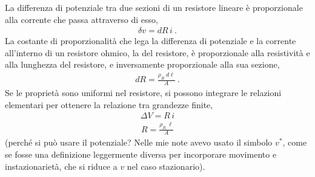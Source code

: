 \documentclass[letterpaper,10pt,english]{jupyterBook}
\begin{document}
\sphinxAtStartPar
{} La differenza di potenziale tra due sezioni di un resistore lineare è proporzionale alla corrente che passa attraverso di esso,
\begin{equation*}
\begin{split}\delta v = dR \, i \ .\end{split}
\end{equation*}
\sphinxAtStartPar
{} La costante di proporzionalità che lega la differenza di potenziale e la corrente all’interno di un resistore ohmico, la  del resistore, è proporzionale alla resistività e alla lunghezza del resistore, e inversamente proporzionale alla sua sezione,
\begin{equation*}
\begin{split}dR = \frac{\rho_R \ d\ell}{A} \ .\end{split}
\end{equation*}
\sphinxAtStartPar
Se le proprietà sono uniformi nel resistore, si possono integrare le relazioni elementari per ottenere la relazione tra grandezze finite,
\begin{equation*}
\begin{split}\Delta V = R \, i \end{split}
\end{equation*}\begin{equation*}
\begin{split}R = \frac{\rho_R \ \ell}{A}\end{split}
\end{equation*}
\sphinxAtStartPar
{} (perché si può usare il potenziale? Nelle mie note avevo usato il simbolo \(v^*\), come se fosse una definizione leggermente diversa per incorporare movimento e instazionarietà, che si riduce a \(v\) nel caso stazionario).

\sphinxAtStartPar
{}

\sphinxAtStartPar
{}

\sphinxAtStartPar
{}

\sphinxAtStartPar
{}

\sphinxstepscope
\end{document}
